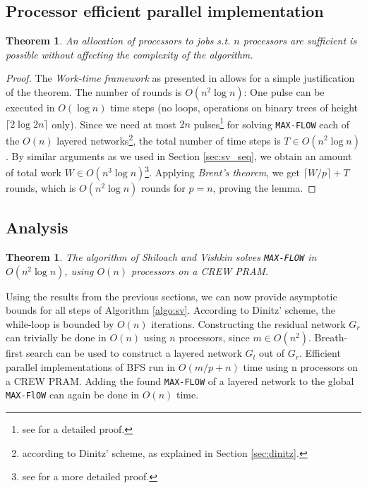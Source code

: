 \documentclass[a4paper,10pt, twocolumn]{article}
\newtheorem{theorem}[lemma]{Theorem}
\begin{document}
\subsection{Processor efficient parallel implementation}
\label{sec:sv_nr_procs}
\begin{theorem}
An allocation of processors to jobs s.t. $n$ processors are sufficient is possible without affecting the complexity of the algorithm. 
\end{theorem}
\begin{proof}
The \emph{Work-time framework} as presented in \cite{vishkin92} allows for a simple justification of the theorem. The number of rounds is $O(n^2 \log n)$: One pulse can be executed in $O(\log n)$ time steps (no loops, operations on binary trees of height $\lceil 2 \log 2n \rceil$ only). Since we need at most $2n$ pulses\footnote{see \cite{yossi81} for a detailed proof.} for solving \lstinline|MAX-FLOW| each of the $O(n)$ layered networks\footnote{according to Dinitz' scheme, as explained in Section \ref{sec:dinitz}.}, the total number of time steps is $T \in O(n^{2} \log n)$. By similar arguments as we used in Section \ref{sec:sv_seq}, we obtain an amount of total work $W \in O(n^{3} \log n)$\footnote{see \cite{yossi81} for a more detailed proof.}. Applying \emph{Brent's theorem}\cite{Brent74}, we get $\lceil W/p \rceil + T$ rounds, which is $O(n^{2} \log n)$ rounds for $p=n$, proving the lemma.
\end{proof}

\subsection{Analysis}
\label{sec:sv_analysis}
\begin{theorem}
The algorithm of Shiloach and Vishkin solves \lstinline|MAX-FLOW| in  $O(n^{2} \log n)$, using $O(n)$ processors on a CREW PRAM.
\end{theorem}

Using the results from the previous sections, we can now provide asymptotic bounds for all steps of Algorithm \ref{algo:sv}. According to Dinitz' scheme, the while-loop is bounded by $O(n)$ iterations. Constructing the residual network $G_r$ can trivially be done in $O(n)$ using $n$ processors, since $m \in O(n^{2})$. Breath-first search can be used to construct a layered network $G_l$ out of $G_r$. Efficient parallel implementations of BFS run in $O(m/p +n)$ time using n processors on a CREW PRAM\cite{Varman87}. Adding the found \lstinline|MAX-FLOW| of a layered network to the global \lstinline|MAX-FlOW| can again be done in $O(n)$ time. 
\end{document}
